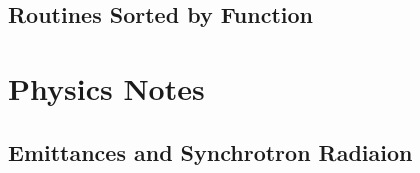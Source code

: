 \documentclass{book}
\begin{document}
\chapter{Routines Sorted by Function}

\part{Physics Notes}

\chapter{Emittances and Synchrotron Radiaion}



\begin{theindex}


\end{theindex}
\end{document}
